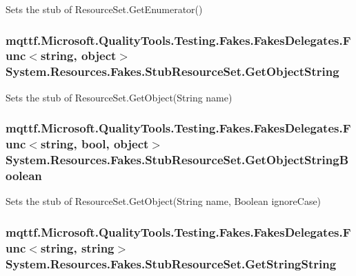 Sets the stub of Resource\-Set.\-Get\-Enumerator()

\hypertarget{class_system_1_1_resources_1_1_fakes_1_1_stub_resource_set_a2e407f37deba41a1e4a1e9a6ac3d8846}{
\subsubsection[{Get\-Object\-String}]{\setlength{\rightskip}{0pt plus 5cm}mqttf.\-Microsoft.\-Quality\-Tools.\-Testing.\-Fakes.\-Fakes\-Delegates.\-Func$<$string, object$>$ System.\-Resources.\-Fakes.\-Stub\-Resource\-Set.\-Get\-Object\-String}}\label{class_system_1_1_resources_1_1_fakes_1_1_stub_resource_set_a2e407f37deba41a1e4a1e9a6ac3d8846}


Sets the stub of Resource\-Set.\-Get\-Object(\-String name)

\hypertarget{class_system_1_1_resources_1_1_fakes_1_1_stub_resource_set_a3ef7a04d12ce0709a3031280583af202}{
\subsubsection[{Get\-Object\-String\-Boolean}]{\setlength{\rightskip}{0pt plus 5cm}mqttf.\-Microsoft.\-Quality\-Tools.\-Testing.\-Fakes.\-Fakes\-Delegates.\-Func$<$string, bool, object$>$ System.\-Resources.\-Fakes.\-Stub\-Resource\-Set.\-Get\-Object\-String\-Boolean}}\label{class_system_1_1_resources_1_1_fakes_1_1_stub_resource_set_a3ef7a04d12ce0709a3031280583af202}


Sets the stub of Resource\-Set.\-Get\-Object(\-String name, Boolean ignore\-Case)

\hypertarget{class_system_1_1_resources_1_1_fakes_1_1_stub_resource_set_ac7cc671eb53c8061df510bdddaed1654}{
\subsubsection[{Get\-String\-String}]{\setlength{\rightskip}{0pt plus 5cm}mqttf.\-Microsoft.\-Quality\-Tools.\-Testing.\-Fakes.\-Fakes\-Delegates.\-Func$<$string, string$>$ System.\-Resources.\-Fakes.\-Stub\-Resource\-Set.\-Get\-String\-String}}\label{class_system_1_1_resources_1_1_fakes_1_1_stub_resource_set_ac7cc671eb53c8061df510bdddaed1654}


